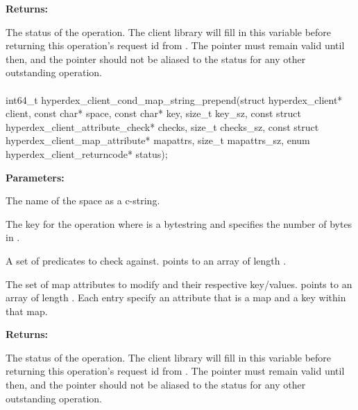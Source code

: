 \noindent\textbf{Returns:}
\begin{description}[labelindent=\widthof{{\code{status}}},leftmargin=*,noitemsep,nolistsep,align=right]
\item[\code{status}] The status of the operation.  The client library will fill in this variable before returning this operation's request id from .  The pointer must remain valid until then, and the pointer should not be aliased to the status for any other outstanding operation.
\end{description}

\paragraph{}
\begin{ccode}
int64_t hyperdex_client_cond_map_string_prepend(struct hyperdex_client* client,
                const char* space,
                const char* key, size_t key_sz,
                const struct hyperdex_client_attribute_check* checks, size_t checks_sz,
                const struct hyperdex_client_map_attribute* mapattrs, size_t mapattrs_sz,
                enum hyperdex_client_returncode* status);
\end{ccode}
\funcdesc 

\noindent\textbf{Parameters:}
\begin{description}[labelindent=\widthof{{\code{mapattrs}, \code{mapattrs\_sz}}},leftmargin=*,noitemsep,nolistsep,align=right]
\item[\code{space}] The name of the space as a c-string.
\item[\code{key}, \code{key\_sz}] The key for the operation where  is a bytestring and  specifies the number of bytes in .
\item[\code{checks}, \code{checks\_sz}] A set of predicates to check against.   points to an array of length .
\item[\code{mapattrs}, \code{mapattrs\_sz}] The set of map attributes to modify and their respective key/values.   points to an array of length .  Each entry specify an attribute that is a map and a key within that map.
\end{description}

\noindent\textbf{Returns:}
\begin{description}[labelindent=\widthof{{\code{status}}},leftmargin=*,noitemsep,nolistsep,align=right]
\item[\code{status}] The status of the operation.  The client library will fill in this variable before returning this operation's request id from .  The pointer must remain valid until then, and the pointer should not be aliased to the status for any other outstanding operation.
\end{description}

